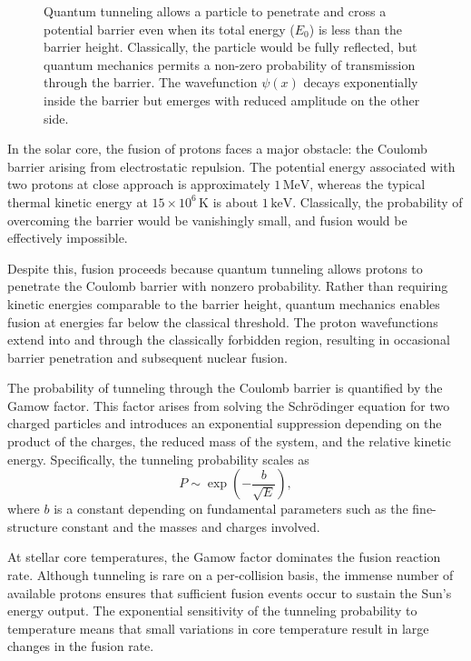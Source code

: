 \begin{figure}[H]
\caption{Quantum tunneling allows a particle to penetrate and cross a potential barrier even when its total energy ($E_0$) is less than the barrier height. Classically, the particle would be fully reflected, but quantum mechanics permits a non-zero probability of transmission through the barrier. The wavefunction $\psi(x)$ decays exponentially inside the barrier but emerges with reduced amplitude on the other side.}
\end{figure}

In the solar core, the fusion of protons faces a major obstacle: the Coulomb barrier arising from electrostatic repulsion. The potential energy associated with two protons at close approach is approximately $1\,\text{MeV}$, whereas the typical thermal kinetic energy at $15 \times 10^6\,\text{K}$ is about $1\,\text{keV}$. Classically, the probability of overcoming the barrier would be vanishingly small, and fusion would be effectively impossible.

Despite this, fusion proceeds because quantum tunneling allows protons to penetrate the Coulomb barrier with nonzero probability. Rather than requiring kinetic energies comparable to the barrier height, quantum mechanics enables fusion at energies far below the classical threshold. The proton wavefunctions extend into and through the classically forbidden region, resulting in occasional barrier penetration and subsequent nuclear fusion.

The probability of tunneling through the Coulomb barrier is quantified by the Gamow factor. This factor arises from solving the Schrödinger equation for two charged particles and introduces an exponential suppression depending on the product of the charges, the reduced mass of the system, and the relative kinetic energy. Specifically, the tunneling probability scales as
\[
P \sim \exp\left( -\frac{b}{\sqrt{E}} \right),
\]
where \( b \) is a constant depending on fundamental parameters such as the fine-structure constant and the masses and charges involved.

At stellar core temperatures, the Gamow factor dominates the fusion reaction rate. Although tunneling is rare on a per-collision basis, the immense number of available protons ensures that sufficient fusion events occur to sustain the Sun's energy output. The exponential sensitivity of the tunneling probability to temperature means that small variations in core temperature result in large changes in the fusion rate.

